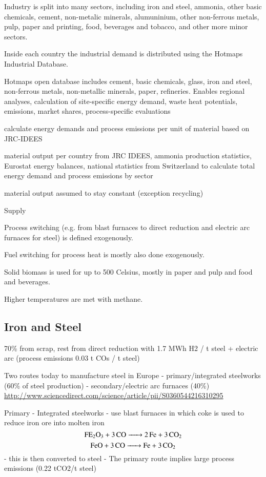 Industry is split into many sectors, including iron and steel, ammonia, other
basic chemicals, cement, non-metalic minerals, alumuninium, other non-ferrous
metals, pulp, paper and printing, food, beverages and tobacco, and other more
minor sectors.

Inside each country the industrial demand is distributed using the Hotmaps
Industrial Database.

Hotmaps open database includes cement, basic chemicals, glass, iron and steel, non-ferrous metals,
non-metallic minerals, paper, refineries. Enables regional analyses, calculation of
site-specific energy demand, waste heat potentials, emissions, market shares,
process-specific evaluations

calculate energy demands and process emissions per unit of material based on JRC-IDEES

material output per country from JRC IDEES, ammonia production statistics,
Eurostat energy balances, national statistics from Switzerland to calculate total energy demand
and process emissions by sector

material output assumed to stay constant (exception recycling)

Supply

Process switching (e.g. from blast furnaces to direct reduction and electric arc
furnaces for steel) is defined exogenously.

Fuel switching for process heat is mostly also done exogenously.

Solid biomass is used for up to 500 Celsius, mostly in paper and pulp and food
and beverages.

Higher temperatures are met with methane.



\subsection{Iron and Steel}

70\% from scrap, rest from direct reduction with 1.7 MWh H2 / t steel + electric arc (process emissions 0.03 t COs / t steel)

Two routes today to manufacture steel in Europe
- primary/integrated steelworks (60\% of steel production)
- secondary/electric arc furnaces (40\%) \url{http://www.sciencedirect.com/science/article/pii/S0360544216310295}

Primary - Integrated steelworks
- use blast furnaces in which coke is used to reduce iron ore into molten iron
\begin{equation}
    \ce{FE2O3 + 3CO -> 2Fe + 3CO2}
\end{equation}
\begin{equation}
    \ce{FeO + 3CO -> Fe + 3CO2}
\end{equation}
- this is then converted to steel
- The primary route implies large process emissions (0.22 tCO2/t steel)


